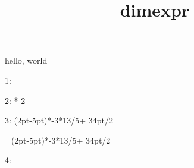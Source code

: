 \documentclass{amsart}
\title{dimexpr}
\begin{document}
\maketitle

hello, world

1: \the \dimexpr 1pt

2: \the \dimexpr 1pt * 2

3: \the \dimexpr (2pt-5pt)*-3*13/5\relax + 34pt/2 \relax

=\dimexpr (2pt-5pt)*-3*13/5\relax + 34pt/2

4: \the{}
\end{document}

